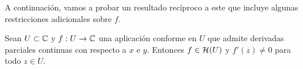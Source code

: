 \begin{comment} %
\begin{proof}
    Supongamos que $f(z)$ es una función holomorfa en $U$ tal que $f'(z) \not = 0$ para $z \in U$ y consideremos $f:z \to w = f(z)$. Sea $\gamma: [a,b] \to U$ una curva suave. Tomemos $\lambda = (f \circ  \gamma)(t)$. Por la regla de la cadena, $\lambda$ es continuamente diferenciable y como $f'(\gamma(t)) \not = 0$, tenemos
    \begin{equation}
        \label{eq:cadena}
        \lambda'(t) = f'(\gamma(t))\gamma'(t).
    \end{equation}

    Por lo tanto, $\lambda$ es una curva suave en el plano $w$.

    Sean $\gamma_1, \gamma_2: [a,b] \to U$ curvas suaves tales que $c=\gamma_1(a) = \gamma_2(a)$. Definimos el ángulo $\theta$ entre $\gamma_1$ y $\gamma_2$ en $c$ como el argumento de $\frac{\gamma_2'(a)}{\gamma_1'(a)}$, es decir,
    \begin{equation*}
        \dfrac{\gamma_2'(a)}{\gamma_1'(a)} = \abs{\dfrac{\gamma_2'(a)}{\gamma_1'(a)}} e^{i\theta}.
    \end{equation*}

    La aplicación $f$ lleva las curvas $\gamma_1$ y $\gamma_2$ en curvas suaves $\lambda_1=f(\gamma_1)$ y $\lambda_2=f(\gamma_2)$ que tienen como punto inicial $d=f(c)$. Por \eqref{eq:cadena} tenemos
    \begin{equation*}
        \dfrac{\lambda_2'(a)}{\lambda_1'(a)} = \dfrac{\gamma_2'(a)}{\gamma_1'(a)}
    \end{equation*}
    entonces el ángulo entre las curvas $\lambda_1$ y $\lambda_2$ en $d = \lambda_1(a) = \lambda_2(a)$ es igual al ángulo $\theta$ entre las curvas $\gamma_1$ y $\gamma_2$ en $c$. \\
\end{proof}
\end{comment}

A continuación, vamos a probar un resultado recíproco a este que incluye algunas restricciones adicionales sobre $f$. \\

\begin{prop}
    Sean $U \subset \mathbb{C}$ y $f: U \to \mathbb{C}$ una aplicación conforme en $U$ que admite derivadas parciales continuas con respecto a $x$ e $y$. Entonces $f \in \mathcal{H}(U)$ y $f'(z) \not = 0$ para todo $z \in U$.
\end{prop}

